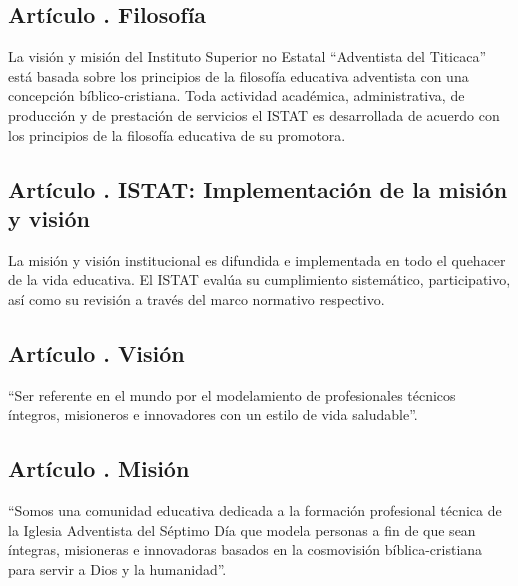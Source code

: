 \subsection{Artículo . Filosofía}
\addtocounter{ns}{1}
La visión y misión del Instituto Superior no Estatal “Adventista del Titicaca” está basada sobre los principios de la filosofía educativa adventista con una concepción bíblico-cristiana. Toda actividad académica, administrativa, de producción y de prestación de servicios el ISTAT es desarrollada de acuerdo con los principios de la filosofía educativa de su promotora.
\subsection{Artículo . ISTAT: Implementación de la misión y visión}
\addtocounter{ns}{1}
La misión y visión institucional es difundida e implementada en todo el quehacer de la vida educativa. El ISTAT evalúa su cumplimiento sistemático, participativo, así como su revisión a través del marco normativo respectivo.
\subsection{Artículo . Visión}
\addtocounter{ns}{1}
“Ser referente en el mundo por el modelamiento de profesionales técnicos íntegros, misioneros e innovadores con un estilo de vida saludable”.
\subsection{Artículo . Misión}
\addtocounter{ns}{1}
“Somos una comunidad educativa dedicada a la formación profesional técnica de la Iglesia Adventista del Séptimo Día que modela personas a fin de que sean íntegras, misioneras e innovadoras basados en la cosmovisión bíblica-cristiana para servir a Dios y la humanidad”.

